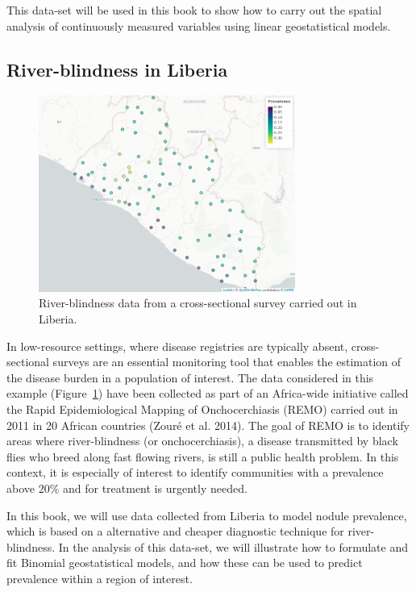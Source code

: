 \documentclass[
  letterpaper,
]{krantz}
\begin{document}
This data-set will be used in this book to show how to carry out the
spatial analysis of continuously measured variables using linear
geostatistical models.

\hypertarget{sec-rb-ch1}{%
\subsection{River-blindness in Liberia}\label{sec-rb-ch1}}

\begin{figure}

{\centering \includegraphics[width=3.31in,height=\textheight]{./figures/liberia_ch1.png}

}

\caption{\label{fig-liberia-ch1}River-blindness data from a
cross-sectional survey carried out in Liberia.}

\end{figure}

In low-resource settings, where disease registries are typically absent,
cross-sectional surveys are an essential monitoring tool that enables
the estimation of the disease burden in a population of interest. The
data considered in this example (Figure~\ref{fig-liberia-ch1}) have been
collected as part of an Africa-wide initiative called the Rapid
Epidemiological Mapping of Onchocerchiasis (REMO) carried out in 2011 in
20 African countries (Zouré et al. 2014). The goal of REMO is to
identify areas where river-blindness (or onchocerchiasis), a disease
transmitted by black flies who breed along fast flowing rivers, is still
a public health problem. In this context, it is especially of interest
to identify communities with a prevalence above 20\% and for treatment
is urgently needed.

In this book, we will use data collected from Liberia to model nodule
prevalence, which is based on a alternative and cheaper diagnostic
technique for river-blindness. In the analysis of this data-set, we will
illustrate how to formulate and fit Binomial geostatistical models, and
how these can be used to predict prevalence within a region of interest.
\end{document}
